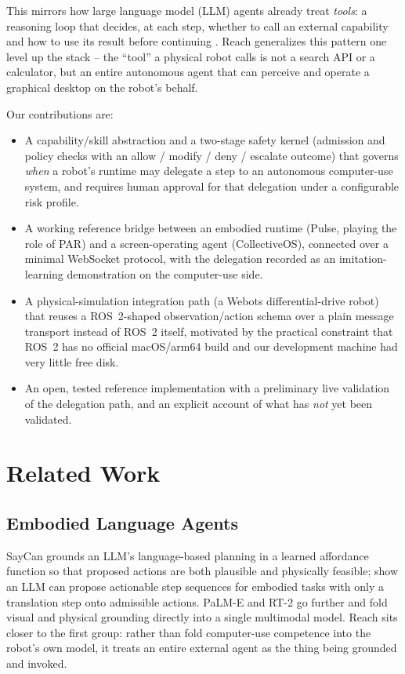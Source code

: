 \documentclass{article}
\begin{document}
This mirrors how large language model (LLM) agents already treat
\textit{tools}: a reasoning loop that decides, at each step, whether to
call an external capability and how to use its result before
continuing \citep{yao2023react,schick2023toolformer}. Reach generalizes this
pattern one level up the stack -- the ``tool'' a physical robot calls is not
a search API or a calculator, but an entire autonomous agent that can
perceive and operate a graphical desktop on the robot's behalf.

Our contributions are:
\begin{itemize}
  \item A capability/skill abstraction and a two-stage safety kernel
  (admission and policy checks with an allow / modify / deny / escalate
  outcome) that governs \emph{when} a robot's runtime may delegate a step
  to an autonomous computer-use system, and requires human approval for
  that delegation under a configurable risk profile.
  \item A working reference bridge between an embodied runtime (Pulse,
  playing the role of PAR) and a screen-operating agent (CollectiveOS),
  connected over a minimal WebSocket protocol, with the delegation
  recorded as an imitation-learning demonstration on the computer-use
  side.
  \item A physical-simulation integration path (a Webots differential-drive
  robot) that reuses a ROS~2-shaped observation/action schema over a plain
  message transport instead of ROS~2 itself, motivated by the practical
  constraint that ROS~2 has no official macOS/arm64 build and our
  development machine had very little free disk.
  \item An open, tested reference implementation with a preliminary live
  validation of the delegation path, and an explicit account of what has
  \emph{not} yet been validated.
\end{itemize}

\section{Related Work}

\subsection{Embodied Language Agents}
SayCan \citep{ahn2022saycan} grounds an LLM's language-based planning in a
learned affordance function so that proposed actions are both plausible and
physically feasible; \citet{huang2022zeroshot} show an
LLM can propose actionable step sequences for embodied tasks with only a
translation step onto admissible actions. PaLM-E \citep{driess2023palme} and
RT-2 \citep{brohan2023rt2} go further and fold visual and physical grounding
directly into a single multimodal model. Reach sits closer to the first
group: rather than fold computer-use competence into the robot's own model,
it treats an entire external agent as the thing being grounded and
invoked.
\end{document}
